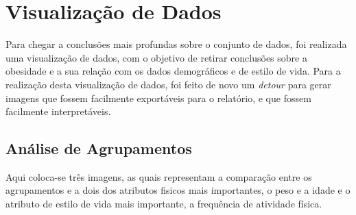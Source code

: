 \documentclass{easychair}
\begin{document}
\section{Visualização de Dados}

Para chegar a conclusões mais profundas sobre o conjunto de dados, foi realizada uma visualização de dados, com o objetivo de retirar conclusões sobre a obesidade e a sua relação com os dados demográficos e de estilo de vida. Para a realização desta visualização de dados, foi feito de novo um \textit{detour} para gerar imagens que fossem facilmente exportáveis para o relatório, e que fossem facilmente interpretáveis.

\subsection{Análise de Agrupamentos}

Aqui coloca-se três imagens, as quais representam a comparação entre os agrupamentos e a dois dos atributos fisicos mais importantes, o peso e a idade e o atributo de estilo de vida mais importante, a frequência de atividade física.
\end{document}
